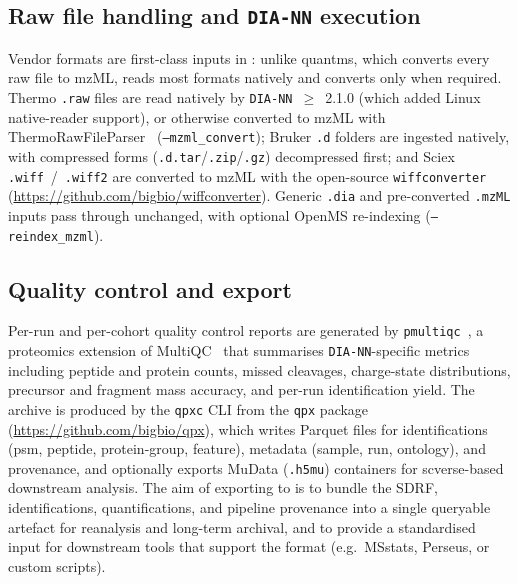 \subsection{Raw file handling and \texttt{DIA-NN} execution}
Vendor formats are first-class inputs in \quantmsdiann{}: unlike quantms, which converts every raw file to mzML, \quantmsdiann{} reads most formats natively and converts only when required. Thermo \texttt{.raw} files are read natively by \texttt{DIA-NN}~$\geq$~2.1.0 (which added Linux native-reader support), or otherwise converted to mzML with ThermoRawFileParser~\cite{hulstaert2020} (\texttt{--mzml\_convert}); Bruker \texttt{.d} folders are ingested natively, with compressed forms (\texttt{.d.tar}/\texttt{.zip}/\texttt{.gz}) decompressed first; and Sciex \texttt{.wiff}~/~\texttt{.wiff2} are converted to mzML with the open-source \texttt{wiffconverter} (\url{https://github.com/bigbio/wiffconverter}). Generic \texttt{.dia} and pre-converted \texttt{.mzML} inputs pass through unchanged, with optional OpenMS re-indexing (\texttt{--reindex\_mzml}).

\subsection{Quality control and \qpx{} export}
Per-run and per-cohort quality control reports are generated by \texttt{pmultiqc}~\cite{larrea2025pmultiqc}, a proteomics extension of MultiQC~\cite{ewels2016multiqc} that summarises \texttt{DIA-NN}-specific metrics including peptide and protein counts, missed cleavages, charge-state distributions, precursor and fragment mass accuracy, and per-run identification yield. The \qpx{} archive is produced by the \texttt{qpxc} CLI from the \texttt{qpx} package (\url{https://github.com/bigbio/qpx}), which writes Parquet files for identifications (psm, peptide, protein-group, feature), metadata (sample, run, ontology), and provenance, and optionally exports MuData (\texttt{.h5mu}) containers for scverse-based~\cite{virshup2023scverse} downstream analysis. The aim of exporting to \qpx{} is to bundle the SDRF, identifications, quantifications, and pipeline provenance into a single queryable artefact for reanalysis and long-term archival, and to provide a standardised input for downstream tools that support the format (e.g.\ MSstats, Perseus, or custom scripts).

